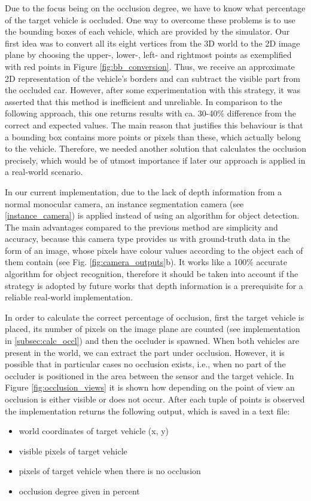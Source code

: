 Due to the focus being on the occlusion degree, we have to know what percentage of the target vehicle is occluded. One way to overcome these problems is to use the bounding boxes of each vehicle, which are provided by the simulator. Our first idea was to convert all its eight vertices from the 3D world to the 2D image plane by choosing the upper-, lower-,  left- and rightmost points as exemplified with red points in Figure \ref{fig:bb_conversion}. Thus, we receive an approximate 2D representation of the vehicle's borders and can subtract the visible part from the occluded car. However, after some experimentation with this strategy, it was asserted that this method is inefficient and unreliable. In comparison to the following approach, this one returns results with ca. 30-40\% difference from the correct and expected values. The main reason that justifies this behaviour is that a bounding box contains more points or pixels than these, which actually belong to the vehicle. Therefore, we needed another solution that calculates the occlusion precisely, which would be of utmost importance if later our approach is applied in a real-world scenario.

In our current implementation, due to the lack of depth information from a normal monocular camera, an instance segmentation camera (see \ref{instance_camera}) is applied instead of using an algorithm for object detection. The main advantages compared to the previous method are simplicity and accuracy, because this camera type provides us with ground-truth data in the form of an image, whose pixels have colour values according to the object each of them contain (see Fig. \ref{fig:camera_outputs}b). It works like a 100\% accurate algorithm for object recognition, therefore it should be taken into account if the strategy is adopted by future works that depth information is a prerequisite for a reliable real-world implementation.

In order to calculate the correct percentage of occlusion, first the target vehicle is placed, its number of pixels on the image plane are counted (see implementation in \ref{subsec:calc_occl}) and then the occluder is spawned. When both vehicles are present in the world, we can extract the part under occlusion. However, it is possible that in particular cases no occlusion exists, i.e., when no part of the occluder is positioned in the area between the sensor and the target vehicle. In Figure \ref{fig:occlusion_views} it is shown how depending on the point of view an occlusion is either visible or does not occur. After each tuple of points is observed the implementation returns the following output, which is saved in a text file:
\begin{itemize}
    \item world coordinates of target vehicle (x, y)
    \item visible pixels of target vehicle
    \item pixels of target vehicle when there is no occlusion
    \item occlusion degree given in percent
\end{itemize}

